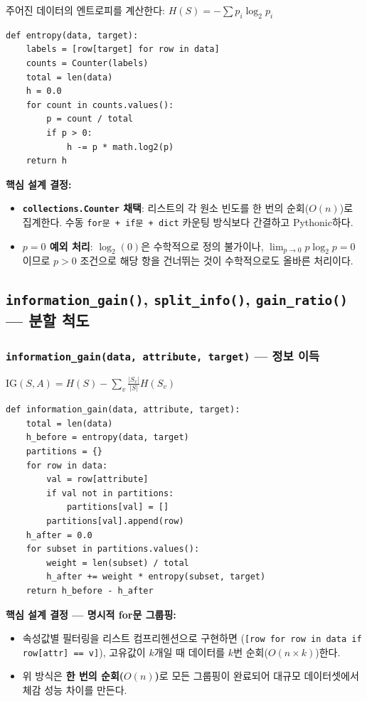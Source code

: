 \documentclass[12pt, a4paper]{article}
\begin{document}
주어진 데이터의 엔트로피를 계산한다: $H(S) = -\sum p_i \log_2 p_i$

\begin{verbatim}
def entropy(data, target):
    labels = [row[target] for row in data]
    counts = Counter(labels)
    total = len(data)
    h = 0.0
    for count in counts.values():
        p = count / total
        if p > 0:
            h -= p * math.log2(p)
    return h
\end{verbatim}

\noindent\textbf{핵심 설계 결정:}
\begin{itemize}
    \item \textbf{\texttt{collections.Counter} 채택}: 리스트의 각 원소 빈도를 한 번의 순회($O(n)$)로 집계한다. 수동 \texttt{for문 + if문 + dict} 카운팅 방식보다 간결하고 Pythonic하다.
    \item \textbf{$p = 0$ 예외 처리}: $\log_2(0)$은 수학적으로 정의 불가이나, $\lim_{p \to 0} p \log_2 p = 0$이므로 $p > 0$ 조건으로 해당 항을 건너뛰는 것이 수학적으로도 올바른 처리이다.
\end{itemize}


\subsection{\texttt{information\_gain()}, \texttt{split\_info()}, \texttt{gain\_ratio()} --- 분할 척도}

\subsubsection*{\texttt{information\_gain(data, attribute, target)} --- 정보 이득}

$\mathrm{IG}(S, A) = H(S) - \sum_v \frac{|S_v|}{|S|} H(S_v)$

\begin{verbatim}
def information_gain(data, attribute, target):
    total = len(data)
    h_before = entropy(data, target)
    partitions = {}
    for row in data:
        val = row[attribute]
        if val not in partitions:
            partitions[val] = []
        partitions[val].append(row)
    h_after = 0.0
    for subset in partitions.values():
        weight = len(subset) / total
        h_after += weight * entropy(subset, target)
    return h_before - h_after
\end{verbatim}

\noindent\textbf{핵심 설계 결정 --- 명시적 for문 그룹핑:}
\begin{itemize}
    \item 속성값별 필터링을 리스트 컴프리헨션으로 구현하면 (\texttt{[row for row in data if row[attr] == v]}), 고유값이 $k$개일 때 데이터를 $k$번 순회($O(n \times k)$)한다.
    \item 위 방식은 \textbf{한 번의 순회($O(n)$)}로 모든 그룹핑이 완료되어 대규모 데이터셋에서 체감 성능 차이를 만든다.
\end{itemize}
\end{document}
